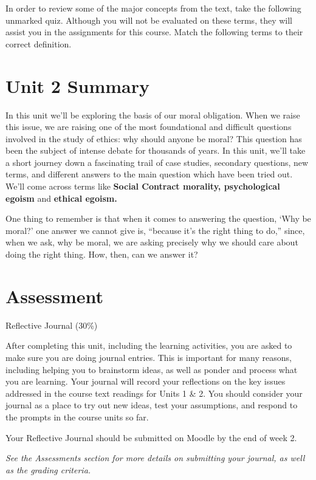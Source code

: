 \documentclass[
]{book}
\begin{document}
\begin{reflect}
In order to review some of the major concepts from the text, take the following unmarked quiz. Although you will not be evaluated on these terms, they will assist you in the assignments for this course. Match the following terms to their correct definition.
\end{reflect}

\hypertarget{unit-2-summary}{%
\section*{Unit 2 Summary}\label{unit-2-summary}}

In this unit we'll be exploring the basis of our moral obligation. When we raise this issue, we are raising one of the most foundational and difficult questions involved in the study of ethics: why should anyone be moral? This question has been the subject of intense debate for thousands of years. In this unit, we'll take a short journey down a fascinating trail of case studies, secondary questions, new terms, and different answers to the main question which have been tried out. We'll come across terms like \textbf{Social Contract morality, psychological egoism} and \textbf{ethical egoism.}

One thing to remember is that when it comes to answering the question, `Why be moral?' one answer we cannot give is, ``because it's the right thing to do,'' since, when we ask, why be moral, we are asking precisely why we should care about doing the right thing. How, then, can we answer it?

\hypertarget{assessment-3}{%
\section*{Assessment}\label{assessment-3}}

\begin{assessment}
{Reflective Journal (30\%)}

After completing this unit, including the learning activities, you are asked to make sure you are doing journal entries. This is important for many reasons, including helping you to brainstorm ideas, as well as ponder and process what you are learning. Your journal will record your reflections on the key issues addressed in the course text readings for Units 1 \& 2. You should consider your journal as a place to try out new ideas, test your assumptions, and respond to the prompts in the course units so far.

Your Reflective Journal should be submitted on Moodle by the end of week 2.

\emph{See the Assessments section for more details on submitting your journal, as well as the grading criteria.}
\end{assessment}
\end{document}
